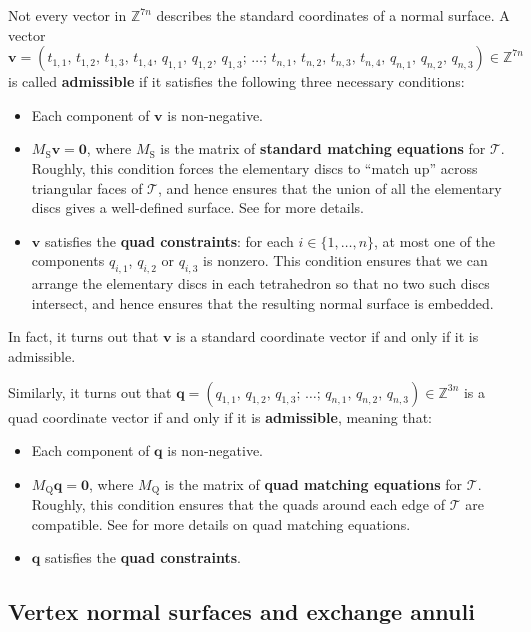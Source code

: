 \documentclass[a4paper,UKenglish,cleveref, autoref, thm-restate]{lipics-v2021}
\newcommand{\tri}{\mathcal{T}}
\begin{document}
Not every vector in $\mathbb{Z}^{7n}$ describes the standard coordinates of a normal surface.
A vector
\[
\mathbf{v} =
( t_{1,1},\, t_{1,2},\, t_{1,3},\, t_{1,4},\,
q_{1,1},\, q_{1,2},\, q_{1,3};\,
\ldots;\,
t_{n,1},\, t_{n,2},\, t_{n,3},\, t_{n,4},\,
q_{n,1},\, q_{n,2},\, q_{n,3} )
\in \mathbb{Z}^{7n}
\]
is called \textbf{admissible} if it satisfies the following three necessary conditions:
\begin{itemize}
\item
Each component of $\mathbf{v}$ is non-negative.
\item
$M_\mathrm{S}\mathbf{v} = \mathbf{0}$, where $M_\mathrm{S}$ is the matrix of \textbf{standard matching equations} for $\tri$.
Roughly, this condition forces the elementary discs to ``match up'' across triangular faces of $\tri$,
and hence ensures that the union of all the elementary discs gives a well-defined surface. See \cite{hass1999computational} for more details.
\item
$\mathbf{v}$ satisfies the \textbf{quad constraints}:
for each $i\in\{1,\ldots,n\}$, at most one of the components $q_{i,1}$, $q_{i,2}$ or $q_{i,3}$ is nonzero.
This condition ensures that we can arrange the elementary discs in each tetrahedron so that
no two such discs intersect, and hence ensures that the resulting normal surface is embedded.
\end{itemize}
In fact, it turns out that $\mathbf{v}$ is a standard coordinate vector if and only if it is admissible.

Similarly, it turns out that
$
\mathbf{q} =
( q_{1,1},\, q_{1,2},\, q_{1,3};\,
\ldots;\,
q_{n,1},\, q_{n,2},\, q_{n,3} )
\in \mathbb{Z}^{3n}
$
is a quad coordinate vector if and only if it is \textbf{admissible}, meaning that:
\begin{itemize}
\item
Each component of $\mathbf{q}$ is non-negative.
\item
$M_\mathrm{Q}\mathbf{q} = \mathbf{0}$, where $M_\mathrm{Q}$ is the matrix of \textbf{quad matching equations} for $\tri$.
Roughly, this condition ensures that the quads around each edge of $\tri$ are compatible.
See \cite{Burton09Converting} for more details on quad matching equations.
\item
$\mathbf{q}$ satisfies the \textbf{quad constraints}.
\end{itemize}

\subsection{Vertex normal surfaces and exchange annuli}
\label{ssec:vertexAndExchange}
\end{document}
